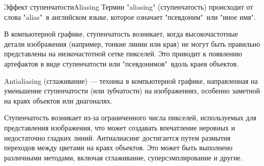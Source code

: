 \documentclass{beamer}
\begin{document}
	\begin{frame}{Эффект ступенчатости}{Aliasing}
		Термин "aliasing" (ступенчатость) происходит от слова "alias"\ в английском языке, которое означает "псевдоним"\ или "иное имя". 
		
		{\footnotesize
		В компьютерной графике, ступенчатость возникает, когда высокочастотные детали изображения (например, тонкие линии или края) не могут быть правильно представлены на низкочастотной сетке пикселей. 
		Это приводит к появлению артефактов в виде ступенчатости или "псевдонимов"\ вдоль краев объектов. 
		}
		
		Antialiasing (сглаживание) --- техника в компьютерной графике, направленная на уменьшение ступенчатости (или зубчатости) на изображениях, особенно заметной на краях объектов или диагоналях. 
				
		{\footnotesize
		Ступенчатость возникает из-за ограниченного числа пикселей, используемых для представления изображения, что может создавать впечатление неровных и недостаточно гладких линий.
		Антиалиасинг достигается путем размытия переходов между цветами на краях объектов. Это может быть выполнено различными методами, включая сглаживание, суперсэмплирование и другие. %
		}

	\end{frame}
\end{document}
